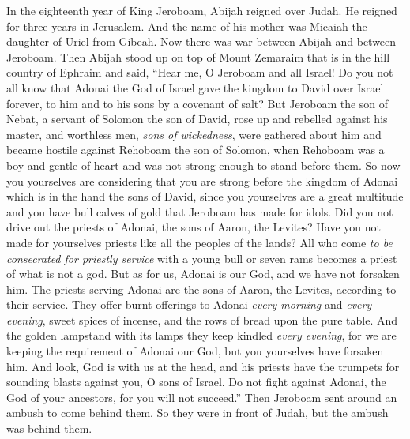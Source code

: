 \begin{biblechapter} %
 In the eighteenth year of King Jeroboam, Abijah reigned over Judah.
\verse He reigned for three years in Jerusalem. And the name of his mother was Micaiah the daughter of Uriel from Gibeah.
\verse Now there was war between Abijah and between Jeroboam.
\verse Then Abijah stood up on top of Mount Zemaraim that is in the hill country of Ephraim and said, “Hear me, O Jeroboam and all Israel!
\verse Do you not all know that Adonai the God of Israel gave the kingdom to David over Israel forever, to him and to his sons by a covenant of salt?
\verse But Jeroboam the son of Nebat, a servant of Solomon the son of David, rose up and rebelled against his master,
\verse and worthless men, \textit{sons of wickedness}, were gathered about him and became hostile against Rehoboam the son of Solomon, when Rehoboam was a boy and gentle of heart and was not strong enough to stand before them.
\verse So now you yourselves are considering that you are strong before the kingdom of Adonai which is in the hand the sons of David, since you yourselves are a great multitude and you have bull calves of gold that Jeroboam has made for idols.
\verse Did you not drive out the priests of Adonai, the sons of Aaron, the Levites? Have you not made for yourselves priests like all the peoples of the lands? All who come \textit{to be consecrated for priestly service} with a young bull or seven rams becomes a priest of what is not a god.
\verse But as for us, Adonai is our God, and we have not forsaken him. The priests serving Adonai are the sons of Aaron, the Levites, according to their service.
\verse They offer burnt offerings to Adonai \textit{every morning} and \textit{every evening}, sweet spices of incense, and the rows of bread upon the pure table. And the golden lampstand with its lamps they keep kindled \textit{every evening}, for we are keeping the requirement of Adonai our God, but you yourselves have forsaken him.
\verse And look, God is with us at the head, and his priests have the trumpets for sounding blasts against you, O sons of Israel. Do not fight against Adonai, the God of your ancestors, for you will not succeed.”
\verse Then Jeroboam sent around an ambush to come behind them. So they were in front of Judah, but the ambush was behind them.

\end{biblechapter}
